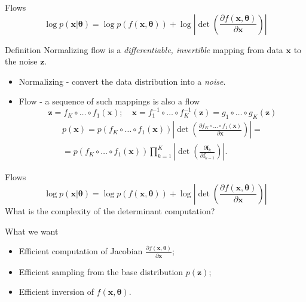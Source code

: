 \documentclass{beamer}
\newcommand{\bx}{\mathbf{x}}
\newcommand{\bz}{\mathbf{z}}
\newcommand{\btheta}{\boldsymbol{\theta}}
\begin{document}
\begin{frame}{Flows}
	\[
	\log p(\bx|\btheta) = \log p(f(\bx, \btheta)) + \log \left|\det \left( \frac{\partial f(\bx, \btheta)}{\partial \bx} \right) \right|
	\]
	\begin{block}{Definition}
		Normalizing flow is a \textit{differentiable, invertible} mapping from data $\bx$ to the noise $\bz$. 
	\end{block}
	\begin{itemize}
		\item Normalizing - convert the data distribution into a \textit{noise}.
		\item Flow - a sequence of such mappings is also a flow
		\[
		\bz = f_K \circ \dots \circ f_1(\bx); \quad \bx = f_1^{-1} \circ \dots \circ f_K^{-1} (\bz) = g_1 \circ \dots \circ g_K(\bz) 
		\] 
		\begin{multline*}
			p(\bx) = p(f_K \circ \dots \circ f_1(\bx)) \left|\det \left(\frac{\partial f_K \circ \dots \circ f_1(\bx)}{\partial \bx} \right) \right| = \\
			= p(f_K \circ \dots \circ f_1(\bx)) \prod_{k=1}^K \left|\det \left(\frac{\partial \mathbf{f}_k}{\partial \mathbf{f}_{k-1}} \right) \right|.
		\end{multline*}
	\end{itemize}
\end{frame}
\begin{frame}{Flows}
	\[
	\log p(\bx|\btheta) = \log p(f(\bx, \btheta)) + \log \left|\det \left( \frac{\partial f(\bx, \btheta)}{\partial \bx} \right) \right|
	\]
	What is the complexity of the determinant computation?
	\begin{block}{What we want}
		\begin{itemize}
			\item Efficient computation of Jacobian $\frac{\partial f(\bx, \btheta)}{\partial \bx}$;
			\item Efficient sampling from the base distribution $p(\bz)$;
			\item Efficient inversion of $f(\bx, \btheta)$.
		\end{itemize}
		
	\end{block}
	
\end{frame}
\end{document}
